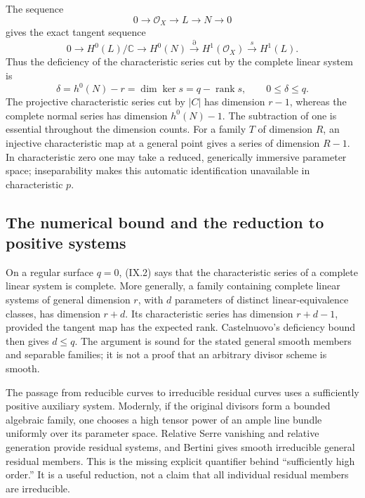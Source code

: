 The sequence
\begin{equation*}\label{cp2-ix-eq1}
0\longrightarrow\mathcal O_X\longrightarrow L\longrightarrow N\longrightarrow0
\tag{IX.1}
\end{equation*}
gives the exact tangent sequence
\begin{equation*}\label{cp2-ix-eq2}
0\longrightarrow H^0(L)/\mathbb C
\longrightarrow H^0(N)
\overset{\partial}{\longrightarrow}H^1(\mathcal O_X)
\overset{s}{\longrightarrow}H^1(L).
\tag{IX.2}
\end{equation*}
Thus the deficiency of the characteristic series cut by the complete linear system is
\begin{equation*}\label{cp2-ix-eq3}
\delta=h^0(N)-r
       =\dim\ker s
       =q-\operatorname{rank}s,\qquad 0\leq\delta\leq q.
\tag{IX.3}
\end{equation*}
The projective characteristic series cut by \(\vert C\vert \) has dimension \(r-1\), whereas the complete normal series has dimension \(h^0(N)-1\). The subtraction of one is essential throughout the dimension counts. For a family \(T\) of dimension \(R\), an injective characteristic map at a general point gives a series of dimension \(R-1\). In characteristic zero one may take a reduced, generically immersive parameter space; inseparability makes this automatic identification unavailable in characteristic \(p\).

\subsection{The numerical bound and the reduction to positive systems}\label{cp2-ix-1-2}

On a regular surface \(q=0\), (IX.2) says that the characteristic series of a complete linear system is complete. More generally, a family containing complete linear systems of general dimension \(r\), with \(d\) parameters of distinct linear-equivalence classes, has dimension \(r+d\). Its characteristic series has dimension \(r+d-1\), provided the tangent map has the expected rank. Castelnuovo's deficiency bound then gives \(d\leq q\). The argument is sound for the stated general smooth members and separable families; it is not a proof that an arbitrary divisor scheme is smooth.

The passage from reducible curves to irreducible residual curves uses a sufficiently positive auxiliary system. Modernly, if the original divisors form a bounded algebraic family, one chooses a high tensor power of an ample line bundle uniformly over its parameter space. Relative Serre vanishing and relative generation provide residual systems, and Bertini gives smooth irreducible general residual members. This is the missing explicit quantifier behind ``sufficiently high order.'' It is a useful reduction, not a claim that all individual residual members are irreducible.

